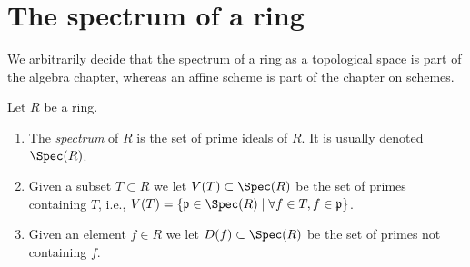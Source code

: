 \section{The spectrum of a ring}
\label{section-spectrum-ring}

\noindent
We arbitrarily decide that the spectrum of a ring as a topological space
is part of the algebra chapter, whereas an affine scheme is part of the
chapter on schemes.

\begin{definition}
\label{definition-spectrum-ring}
Let $R$ be a ring.
\begin{enumerate}
\item The {\it spectrum} of $R$ is the set of prime ideals of $R$.
It is usually denoted $\Spec(R)$.
\item Given a subset $T \subset R$ we let $V(T) \subset \Spec(R)$
be the set of primes containing $T$, i.e., $V(T) = \{ \mathfrak p \in
\Spec(R) \mid \forall f\in T, f\in \mathfrak p\}$.
\item Given an element $f \in R$ we let $D(f) \subset \Spec(R)$
be the set of primes not containing $f$.
\end{enumerate}
\end{definition}

